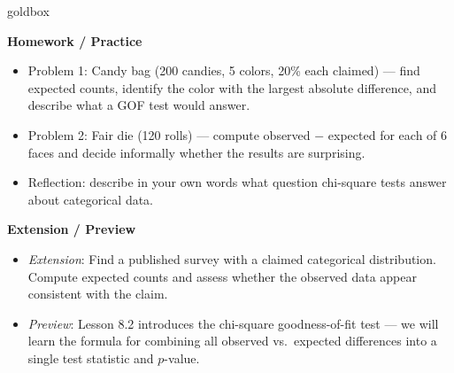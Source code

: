 \documentclass[10pt]{article}
\begin{document}
\begin{skillbox}{goldbox}
\begin{minipage}[t]{0.48\linewidth}
    \textbf{Homework / Practice}
    \begin{itemize}
        \item Problem 1: Candy bag (200 candies, 5 colors, 20\% each claimed) ---
              find expected counts, identify the color with the largest absolute
              difference, and describe what a GOF test would answer.
        \item Problem 2: Fair die (120 rolls) --- compute observed $-$ expected
              for each of 6 faces and decide informally whether the results
              are surprising.
        \item Reflection: describe in your own words what question chi-square
              tests answer about categorical data.
    \end{itemize}
\end{minipage}
\hfill
\begin{minipage}[t]{0.48\linewidth}
    \textbf{Extension / Preview}
    \begin{itemize}
        \item \textit{Extension}: Find a published survey with a claimed categorical
              distribution. Compute expected counts and assess whether the observed
              data appear consistent with the claim.
        \item \textit{Preview}: Lesson 8.2 introduces the chi-square goodness-of-fit
              test --- we will learn the formula for combining all observed vs.\
              expected differences into a single test statistic and $p$-value.
    \end{itemize}
\end{minipage}
\end{skillbox}
\end{document}
